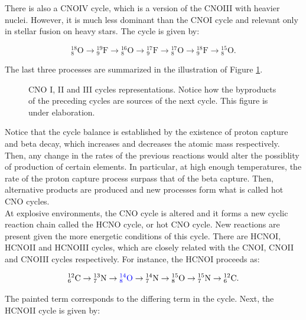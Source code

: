 \documentclass[openany]{book}
\begin{document}
There is also a CNOIV cycle, which is a version of the CNOIII with heavier nuclei. However, it is much less dominant than the CNOI cycle and relevant only in stellar fusion on heavy stars. The cycle is given by:

\begin{equation} \label{eq:reaction_CNO_O_4}
	\mathrm{{}_{8}^{18}O  \rightarrow {}^{19}_{9}F  \rightarrow {}^{16}_{8}O  \rightarrow {}^{17}_{9}F  \rightarrow {}^{17}_{8}O  \rightarrow {}^{18}_{9}F \rightarrow {}^{15}_{8}O }.
\end{equation}


The last three processes are summarized in the illustration of Figure \ref{fig:CNOcyles}.

\begin{figure}[H]
	
	\caption[CNO I, II and III cycles representations]{CNO I, II and III cycles representations. Notice how the byproducts of the preceding cycles are sources of the next cycle. This figure is under elaboration.}
	\label{fig:CNOcyles}
\end{figure}

Notice that the cycle balance is established by the existence of proton capture and beta decay, which increases and decreases the atomic mass respectively. Then, any change in the rates of the previous reactions would alter the possiblity of production of certain elements. In particular, at high enough temperatures, the rate of the proton capture process surpass that of the beta capture. Then, alternative products are produced and new processes form what is called hot CNO cycles. \\ 

At explosive environments, the CNO cycle is altered and it forms a new cyclic reaction chain called the HCNO cycle, or hot CNO cycle.  New reactions are present given the more energetic conditions of this cycle. There are HCNOI, HCNOII and HCNOIII cycles, which are closely related with the CNOI, CNOII and CNOIII cycles respectively. For instance, the HCNOI proceeds as: 

\begin{equation} \label{eq:reaction_HCNO_C}
	\mathrm{{}_{6}^{12}C  \rightarrow {}^{13}_{7}N  \rightarrow \textcolor{blue}{{}^{14}_{8}O}  \rightarrow {}^{14}_{7}N  \rightarrow {}^{15}_{8}O  \rightarrow {}^{15}_{7}N \rightarrow {}^{12}_{6}C}.
\end{equation}

The painted term corresponds to the differing term in the cycle. Next, the HCNOII cycle is given by: 
\end{document}
